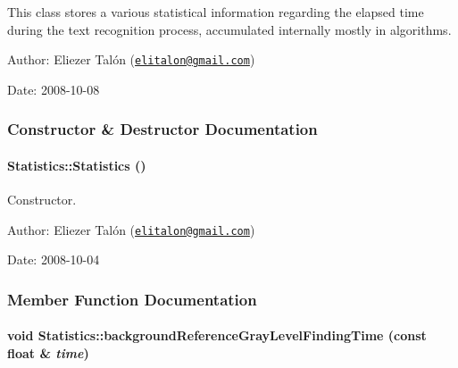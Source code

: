 This class stores a various statistical information regarding the elapsed time during the text recognition process, accumulated internally mostly in algorithms.

\begin{Desc}
\item[Author:]Eliezer Talón (\href{mailto:elitalon@gmail.com}{\tt elitalon@gmail.com}) \end{Desc}
\begin{Desc}
\item[Date:]2008-10-08 \end{Desc}


\subsubsection{Constructor \& Destructor Documentation}
\hypertarget{class_statistics_60ddd90a571ed4c3ce8c0f6317a36d63}{
\paragraph[{Statistics}]{\setlength{\rightskip}{0pt plus 5cm}Statistics::Statistics ()}\hfill}
\label{class_statistics_60ddd90a571ed4c3ce8c0f6317a36d63}


Constructor. 

\begin{Desc}
\item[Author:]Eliezer Talón (\href{mailto:elitalon@gmail.com}{\tt elitalon@gmail.com}) \end{Desc}
\begin{Desc}
\item[Date:]2008-10-04 \end{Desc}


\subsubsection{Member Function Documentation}
\hypertarget{class_statistics_5c9fede192f06bc757d18336dfcf84cf}{
\paragraph[{backgroundReferenceGrayLevelFindingTime}]{\setlength{\rightskip}{0pt plus 5cm}void Statistics::backgroundReferenceGrayLevelFindingTime (const float \& {\em time})}\hfill}
\label{class_statistics_5c9fede192f06bc757d18336dfcf84cf}



